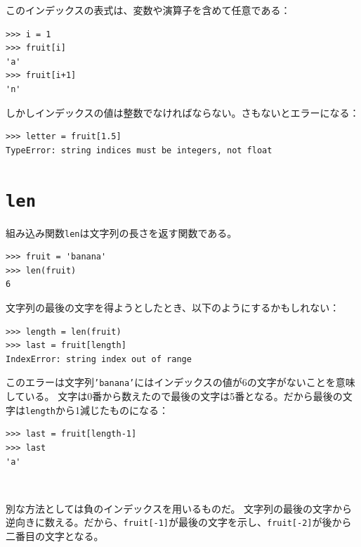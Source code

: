 \documentclass[a4j,12pt,makeidx]{jbook}
\begin{document}
このインデックスの表式は、変数や演算子を含めて任意である：
\begin{verbatim}
>>> i = 1
>>> fruit[i]
'a'
>>> fruit[i+1]
'n'
\end{verbatim}
しかしインデックスの値は整数でなければならない。さもないとエラーになる：
\begin{verbatim}
>>> letter = fruit[1.5]
TypeError: string indices must be integers, not float
\end{verbatim}
%
\section{{\tt len}}
組み込み関数{\tt len}は文字列の長さを返す関数である。
\begin{verbatim}
>>> fruit = 'banana'
>>> len(fruit)
6
\end{verbatim}
文字列の最後の文字を得ようとしたとき、以下のようにするかもしれない：
\begin{verbatim}
>>> length = len(fruit)
>>> last = fruit[length]
IndexError: string index out of range
\end{verbatim}
このエラーは文字列{\tt 'banana'}にはインデックスの値が6の文字がないことを意味している。
文字は0番から数えたので最後の文字は5番となる。だから最後の文字は{\tt length}から1減じたものになる：
\begin{verbatim}
>>> last = fruit[length-1]
>>> last
'a'
\end{verbatim}　\par
別な方法としては負のインデックスを用いるものだ。
文字列の最後の文字から逆向きに数える。だから、{\tt fruit[-1]}が最後の文字を示し、{\tt fruit[-2]}が後から二番目の文字となる。
%
\end{document}
